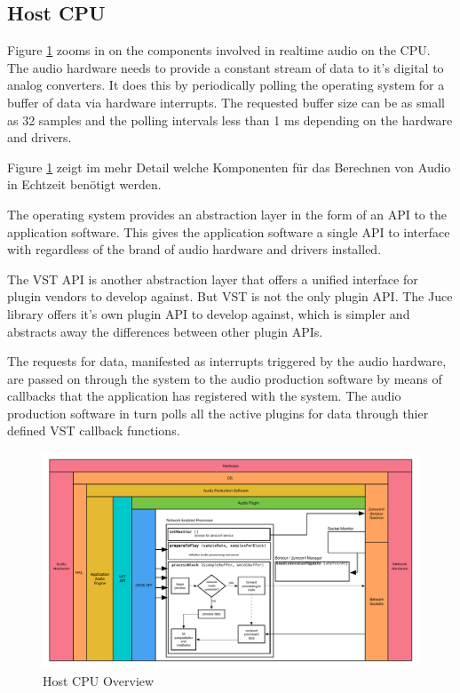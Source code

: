 \subsection{Host CPU}

Figure \ref{fig:arch_02} zooms in on the components involved in realtime audio on the CPU. The audio hardware needs to provide a constant stream of data to it's digital to analog converters. It does this by periodically polling the operating system for a buffer of data via hardware interrupts. The requested buffer size can be as small as 32 samples and the polling intervals less than 1 ms depending on the hardware and drivers.

Figure \ref{fig:arch_02} zeigt im mehr Detail welche Komponenten für das Berechnen von Audio in Echtzeit benötigt werden.  

The operating system provides an abstraction layer in the form of an API to the application software. This gives the application software a single API to interface with regardless of the brand of audio hardware and drivers installed.

The VST API is another abstraction layer that offers a unified interface for plugin vendors to develop against. But VST is not the only plugin API. The Juce library offers it's own plugin API to develop against, which is simpler and abstracts away the differences between other plugin APIs.

The requests for data, manifested as interrupts triggered by the audio hardware, are passed on through the system to the audio production software by means of callbacks that the application has registered with the system. The audio production software in turn polls all the active plugins for data through thier defined VST callback functions.

\begin{figure}[H]
    \centering
    \includegraphics[width=\textwidth]{assets/architecture_02.pdf}
    \caption{Host CPU Overview}
    \label{fig:arch_02}
\end{figure}

